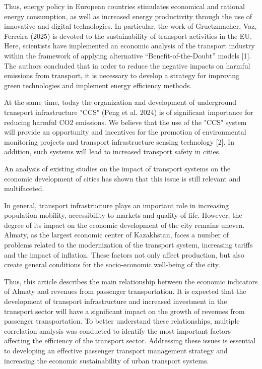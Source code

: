 \begin{multicols}{2}
Thus, energy policy in European countries stimulates economical and
rational energy consumption, as well as increased energy productivity
through the use of innovative and digital technologies. In particular,
the work of Gruetzmacher, Vaz, Ferreira (2025) is devoted to the
sustainability of transport activities in the EU. Here, scientists have
implemented an economic analysis of the transport industry within the
framework of applying alternative ``Benefit-of-the-Doubt'' models
{[}1{]}. The authors concluded that in order to reduce the negative
impacts on harmful emissions from transport, it is necessary to develop
a strategy for improving green technologies and implement energy
efficiency methods.

At the same time, today the organization and development of underground
transport infrastructure "CCS" (Peng et al. 2024) is of significant
importance for reducing harmful CO2 emissions. We believe that the use
of the "CCS" system will provide an opportunity and incentives for the
promotion of environmental monitoring projects and transport
infrastructure sensing technology {[}2{]}. In addition, such systems
will lead to increased transport safety in cities.

An analysis of existing studies on the impact of transport systems on
the economic development of cities has shown that this issue is still
relevant and multifaceted.

In general, transport infrastructure plays an important role in
increasing population mobility, accessibility to markets and quality of
life. However, the degree of its impact on the economic development of
the city remains uneven. Almaty, as the largest economic center of
Kazakhstan, faces a number of problems related to the modernization of
the transport system, increasing tariffs and the impact of inflation.
These factors not only affect production, but also create general
conditions for the socio-economic well-being of the city.

Thus, this article describes the main relationship between the economic
indicators of Almaty and revenues from passenger transportation. It is
expected that the development of transport infrastructure and increased
investment in the transport sector will have a significant impact on the
growth of revenues from passenger transportation. To better understand
these relationships, multiple correlation analysis was conducted to
identify the most important factors affecting the efficiency of the
transport sector. Addressing these issues is essential to developing an
effective passenger transport management strategy and increasing the
economic sustainability of urban transport systems.


\end{multicols}
